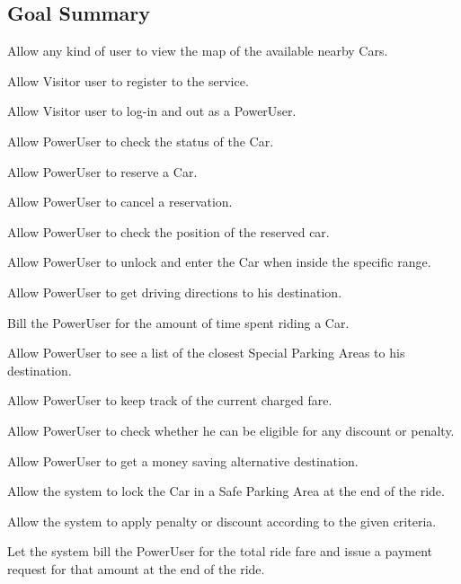 \subsection{Goal Summary}
\begin{enumerate}[label={[}G\arabic*{]}]
\item Allow any kind of user to view the map of the available nearby Cars.
\item Allow Visitor user to register to the service.
\item Allow Visitor user to log-in and out as a PowerUser.
\item Allow PowerUser to check the status of the Car.
\item Allow PowerUser to reserve a Car.
\item Allow PowerUser to cancel a reservation.
\item Allow PowerUser to check the position of the reserved car.
\item Allow PowerUser to unlock and enter the Car when inside the specific range.
\item Allow PowerUser to get driving directions to his destination.
\item Bill the PowerUser for the amount of time spent riding a Car.
\item Allow PowerUser to see a list of the closest Special Parking Areas to his destination.
\item Allow PowerUser to keep track of the current charged fare. 
\item Allow PowerUser to check whether he can be eligible for any discount or penalty.
\item Allow PowerUser to get a money saving alternative destination.
\item Allow the system to lock the Car in a Safe Parking Area at the end of the ride.
\item Allow the system to apply penalty or discount according to the given criteria.
\item Let the system bill the PowerUser for the total ride fare and issue a payment request for that amount at the end of the ride.
\end{enumerate}